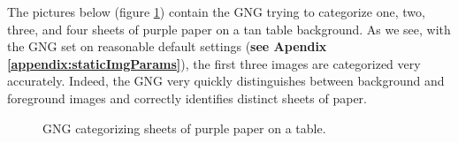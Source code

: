 \documentclass{article}
\renewcommand{\|}{\origbar} %
\begin{document}
The pictures below (figure \ref{fig:1-4papers}) contain the GNG trying to categorize one, two, three, and four sheets of purple paper on a tan table background. As we see, with the GNG set on reasonable default settings ({\bf see Apendix \ref{appendix:staticImgParams}}), the first three images are categorized very accurately. Indeed, the GNG very quickly distinguishes between background and foreground images and correctly identifies distinct sheets of paper. 

\begin{figure}[h!]
  \centering


  \caption{GNG categorizing sheets of purple paper on a table.}
  \label{fig:1-4papers}
\end{figure}
\end{document}
